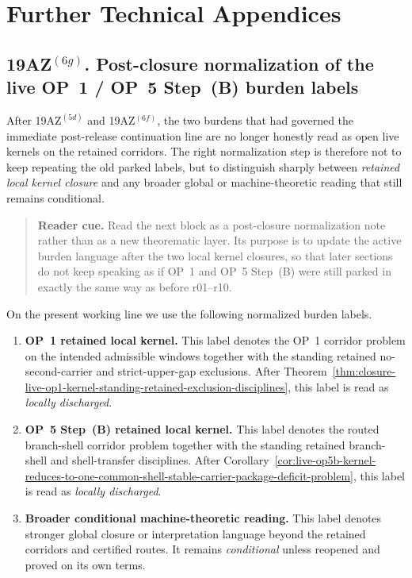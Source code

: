 \section{Further Technical Appendices}
\label{app:further-technical}



\subsection*{19AZ$^{(6g)}$. Post-closure normalization of the live OP~1 / OP~5 Step~(B) burden labels}
\label{sec:post-closure-normalization-op1-op5b-burden-labels}
After 19AZ$^{(5d)}$ and 19AZ$^{(6f)}$, the two burdens that had governed the immediate post-release continuation line are no longer honestly read as open live kernels on the retained corridors. The right normalization step is therefore not to keep repeating the old parked labels, but to distinguish sharply between \emph{retained local kernel closure} and any broader global or machine-theoretic reading that still remains conditional.

\begin{quote}\small
\noindent\textbf{Reader cue.} Read the next block as a post-closure normalization note rather than as a new theorematic layer. Its purpose is to update the active burden language after the two local kernel closures, so that later sections do not keep speaking as if OP~1 and OP~5 Step~(B) were still parked in exactly the same way as before r01--r10.
\end{quote}

\begin{definition}
\label{def:post-closure-burden-labels-retained-op-kernels}
On the present working line we use the following normalized burden labels.
\begin{enumerate}[leftmargin=2em]
  \item \textbf{OP~1 retained local kernel.} This label denotes the OP~1 corridor problem on the intended admissible windows together with the standing retained no-second-carrier and strict-upper-gap exclusions. After Theorem~\ref{thm:closure-live-op1-kernel-standing-retained-exclusion-disciplines}, this label is read as \emph{locally discharged}.
  \item \textbf{OP~5 Step~(B) retained local kernel.} This label denotes the routed branch-shell corridor problem together with the standing retained branch-shell and shell-transfer disciplines. After Corollary~\ref{cor:live-op5b-kernel-reduces-to-one-common-shell-stable-carrier-package-deficit-problem}, this label is read as \emph{locally discharged}.
  \item \textbf{Broader conditional machine-theoretic reading.} This label denotes stronger global closure or interpretation language beyond the retained corridors and certified routes. It remains \emph{conditional} unless reopened and proved on its own terms.
\end{enumerate}
\end{definition}

